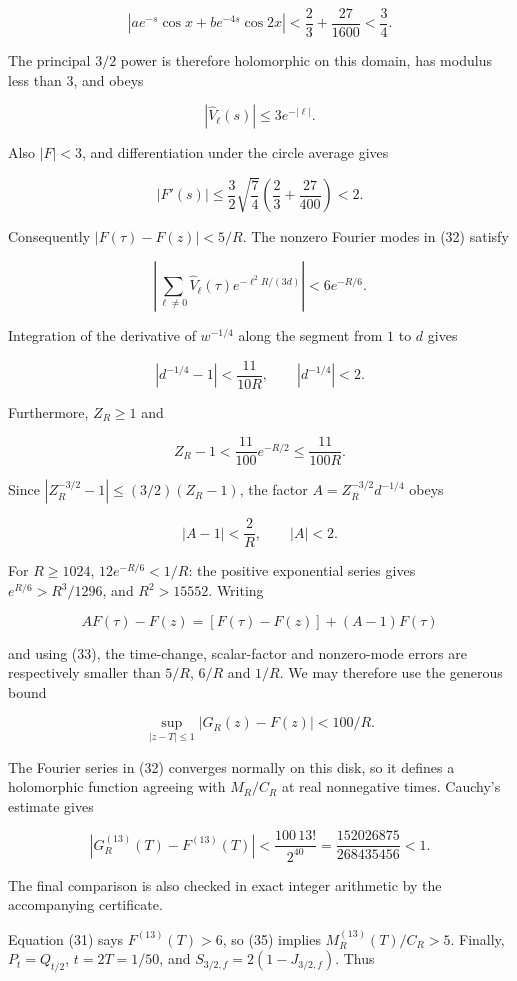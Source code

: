 \documentclass[
  11pt,
]{article}
\begin{document}
\[
|ae^{-s}\cos x+be^{-4s}\cos2x|
 <\frac23+\frac{27}{1600}<\frac34.
\]

The principal \(3/2\) power is therefore holomorphic on this domain, has
modulus less than \(3\), and obeys

\[
|\widehat V_\ell(s)|\leq3e^{-|\ell|}.
\]

Also \(|F|<3\), and differentiation under the circle average gives

\[
|F'(s)|\leq\frac32\sqrt{\frac74}
       \left(\frac23+\frac{27}{400}\right)<2.
\]

Consequently \(|F(\tau)-F(z)|<5/R\). The nonzero Fourier modes in (32)
satisfy

\[
\tag{33}
 \left|\sum_{\ell\ne0}\widehat V_\ell(\tau)
                  e^{-\ell^2R/(3d)}\right|
 <6e^{-R/6}.
\]

Integration of the derivative of \(w^{-1/4}\) along the segment from
\(1\) to \(d\) gives

\[
|d^{-1/4}-1|<\frac{11}{10R},\qquad |d^{-1/4}|<2.
\]

Furthermore, \(Z_R\geq1\) and

\[
Z_R-1<\frac{11}{100}e^{-R/2}\leq\frac{11}{100R}.
\]

Since \(|Z_R^{-3/2}-1|\leq(3/2)(Z_R-1)\), the factor
\(A=Z_R^{-3/2}d^{-1/4}\) obeys

\[
|A-1|<\frac2R,\qquad |A|<2.
\]

For \(R\geq1024\), \(12e^{-R/6}<1/R\): the positive exponential series
gives \(e^{R/6}>R^3/1296\), and \(R^2>15552\). Writing

\[
A F(\tau)-F(z)=[F(\tau)-F(z)]+(A-1)F(\tau)
\]

and using (33), the time-change, scalar-factor and nonzero-mode errors
are respectively smaller than \(5/R\), \(6/R\) and \(1/R\). We may
therefore use the generous bound

\[
\tag{34}
 \sup_{|z-T|\leq1}|G_R(z)-F(z)|<100/R.
\]

The Fourier series in (32) converges normally on this disk, so it
defines a holomorphic function agreeing with \(M_R/C_R\) at real
nonnegative times. Cauchy's estimate gives

\[
\tag{35}
 |G_R^{(13)}(T)-F^{(13)}(T)|
 <\frac{100\,13!}{2^{40}}
 =\frac{152026875}{268435456}<1.
\]

The final comparison is also checked in exact integer arithmetic by the
accompanying certificate.

Equation (31) says \(F^{(13)}(T)>6\), so (35) implies
\(M_R^{(13)}(T)/C_R>5\). Finally, \(P_t=Q_{t/2}\), \(t=2T=1/50\), and
\(S_{3/2,f}=2(1-J_{3/2,f})\). Thus
\end{document}

